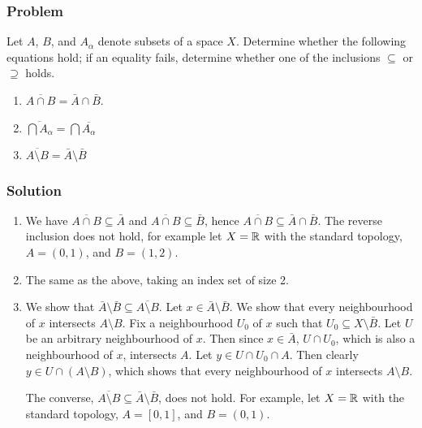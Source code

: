 \subsubsection{Problem}
Let $A$, $B$, and $A_\alpha$ denote subsets of a space $X$. Determine whether the following equations hold; if an equality fails, determine whether one of the inclusions $\subseteq$ or $\supseteq$ holds.
\begin{enumerate}
 \item $\overline{A \cap B} = \bar A \cap \bar B$.
 \item $\overline{\bigcap A_\alpha} = \bigcap \overline{A_\alpha}$
 \item $\overline{A \setminus B} = \bar A \setminus \bar B$
\end{enumerate}
 
\subsubsection{Solution}
\begin{enumerate}
 \item We have $\overline{A \cap B} \subseteq \bar A$ and $\overline{A \cap B} \subseteq \bar B$, hence $\overline{A \cap B} \subseteq \bar A \cap \bar B$. The reverse inclusion does not hold, for example let $X = \mathbb R$ with the standard topology, $A = (0,1)$, and $B = (1,2)$.
 
 \item The same as the above, taking an index set of size 2.
 
 \item We show that $\bar A \setminus \bar B \subseteq \overline{A \setminus B}$. Let $x \in \bar A \setminus \bar B$. We show that every neighbourhood of $x$ intersects $A \setminus B$. Fix a neighbourhood $U_0$ of $x$ such that $U_0 \subseteq X \setminus \bar B$. Let $U$ be an arbitrary neighbourhood of $x$. Then since $x \in \bar A$, $U \cap U_0$, which is also a neighbourhood of $x$, intersects $A$. Let $y \in U \cap U_0 \cap A$. Then clearly $y \in U \cap (A \setminus B)$, which shows that every neighbourhood of $x$ intersects $A \setminus B$.
 
 The converse, $\overline{A \setminus B} \subseteq \bar A \setminus \bar B$, does not hold. For example, let $X = \mathbb R$ with the standard topology, $A = [0,1]$, and $B = (0,1)$. 
\end{enumerate}


\subsection{}
